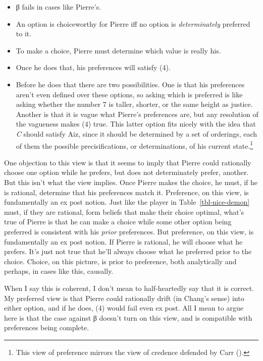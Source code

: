 \documentclass[
  11pt,
  letterpaper,
  DIV=11,
  numbers=noendperiod,
  twoside]{scrartcl}
\providecommand{\tightlist}{%
  \setlength{\itemsep}{0pt}\setlength{\parskip}{0pt}}
\begin{document}
\begin{itemize}
\tightlist
\item
  β fails in cases like Pierre's.
\item
  An option is choiceworthy for Pierre iff no option is
  \emph{determinately} preferred to it.
\item
  To make a choice, Pierre must determine which value is really his.
\item
  Once he does that, his preferences will satisfy (4).
\item
  Before he does that there are two possibilities. One is that his
  preferences aren't even defined over these options, so asking which is
  preferred is like asking whether the number 7 is taller, shorter, or
  the same height as justice. Another is that it is vague what Pierre's
  preferences are, but any resolution of the vagueness makes (4) true.
  This latter option fits nicely with the idea that \emph{C} should
  satisfy Aiz, since it should be determined by a set of orderings, each
  of them the possible precisifications, or determinations, of his
  current state.\footnote{This view of preference mirrors the view of
    credence defended by Carr ().}
\end{itemize}

One objection to this view is that it seems to imply that Pierre could
rationally choose one option while he prefers, but does not
determinately prefer, another. But this isn't what the view implies.
Once Pierre makes the choice, he must, if he is rational, determine that
his preferences match it. Preference, on this view, is fundamentally an
ex post notion. Just like the player in Table~\ref{tbl-nice-demon} must,
if they are rational, form beliefs that make their choice optimal,
what's true of Pierre is that he can make a choice while some other
option being preferred is consistent with his \emph{prior} preferences.
But preference, on this view, is fundamentally an ex post notion. If
Pierre is rational, he will choose what he prefers. It's just not true
that he'll always choose what he preferred prior to the choice. Choice,
on this picture, is prior to preference, both analytically and perhaps,
in cases like this, causally.

When I say this is coherent, I don't mean to half-heartedly say that it
is correct. My preferred view is that Pierre could rationally drift (in
Chang's sense) into either option, and if he does, (4) would fail even
ex post. All I mean to argue here is that the case against β doesn't
turn on this view, and is compatible with preferences being complete.
\end{document}
